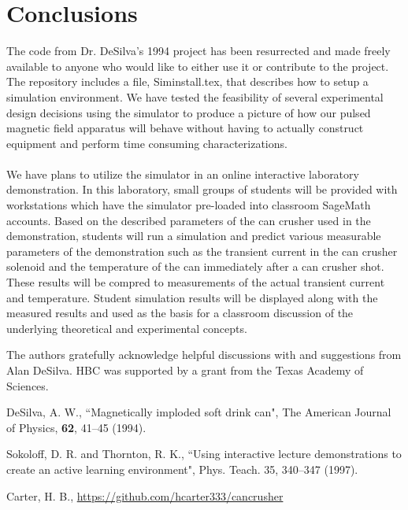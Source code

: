 \documentclass[prb,preprint]{revtex4-1}
\begin{document}
\section{Conclusions}
The code from Dr. DeSilva's 1994 project has been resurrected and made freely available to anyone who would like to either use it or contribute to the project\cite{gitSim}.  The repository includes a file, Siminstall.tex, that describes how to setup a simulation environment.  We have tested the feasibility of several experimental design decisions using the simulator to produce a picture of how our pulsed magnetic field apparatus will behave without having to actually construct equipment and perform time consuming characterizations.
\\
\\
We have plans to utilize the simulator in an online interactive laboratory demonstration\cite{ILD}.  In this laboratory, small groups of students will be provided with workstations which have the simulator pre-loaded into classroom SageMath accounts.  Based on the described parameters of the can crusher used in the demonstration, students will run a simulation and predict various measurable parameters of the demonstration such as the transient current in the can crusher solenoid and the temperature of the can immediately after a can crusher shot.  These results will be compred to measurements of the actual transient current and temperature.  Student simulation results will be displayed along with the measured results and used as the basis for a classroom discussion of the underlying theoretical and experimental concepts.

\begin{acknowledgments}
The authors gratefully acknowledge helpful discussions with and suggestions from Alan DeSilva.  HBC was supported by a grant from the Texas Academy of Sciences.\end{acknowledgments}

\begin{thebibliography}{99}

 DeSilva, A. W., ``Magnetically imploded soft drink can", The American Journal of Physics, \textbf{62}, 41--45 (1994).  

 Sokoloff, D. R. and Thornton, R. K., ``Using interactive lecture demonstrations to create an active learning environment", Phys. Teach. 35, 340--347 (1997).  

 Carter, H. B., \url{https://github.com/hcarter333/cancrusher}


\end{thebibliography}
\end{document}

